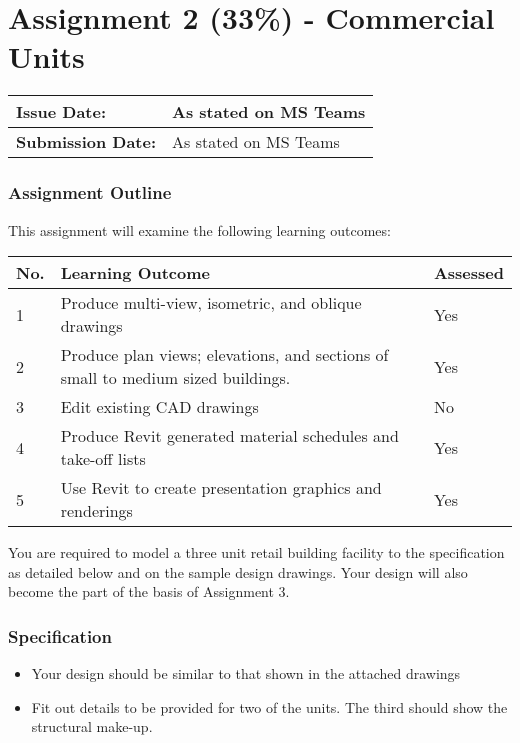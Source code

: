 
	
\part*{Assignment 2 (33\%) - Commercial Units}

\begin{tabularx}{\textwidth}{ |X|X| }
	\hline
	\textbf{Issue Date:} & As stated on MS Teams\\
	\hline 
	\textbf{Submission Date:}  & As stated on MS Teams  \\
	\hline
\end{tabularx}

\section*{Assignment Outline}

This assignment will examine the following learning outcomes:

\begin{tabularx}{\textwidth}{ |X|X|X| }
	\hline
	\textbf{No.} & \textbf{Learning Outcome} & \textbf{Assessed} \\
	\hline 
	1  & Produce multi-view, isometric, and oblique drawings & Yes \\
	2  & Produce plan views; elevations, and sections of small to medium sized buildings. & Yes \\
	3  & Edit existing CAD drawings & No \\
	4  & Produce Revit generated material schedules and take-off lists & Yes \\
	5  & Use Revit to create presentation graphics and renderings & Yes \\
	\hline
\end{tabularx}


You are required to model a three unit retail building facility to the specification as detailed below and on the sample design drawings.  Your design will also become the part of the basis of Assignment 3.

\section*{Specification}


\begin{itemize}
	\item Your design should be similar to that shown in the attached drawings
	\item Fit out details to be provided for two of the units.  The third should show the structural make-up.
\end{itemize}


